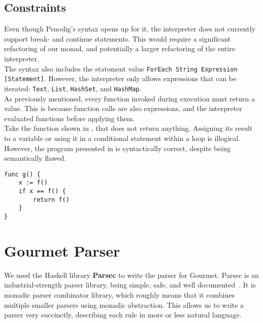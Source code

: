 \subsection{Constraints}

Even though Psnodig's syntax opens up for it, the interpreter does not currently support break- and continue statements. This would require a significant refactoring of our monad, and potentially a larger refactoring of the entire interpreter. \\

The syntax also includes the statement value \texttt{ForEach String Expression [Statement]}. However, the interpreter only allows expressions that can be iterated: \texttt{Text}, \texttt{List}, \texttt{HashSet}, and \texttt{HashMap}. \\

As previously mentioned, every function invoked during execution must return a value. This is because function calls are also expressions, and the interpreter evaluated functions before applying them. \\

Take the function shown in , that does not return anything. Assigning its result to a variable or using it in a conditional statement within a loop is illogical. However, the program presented in  is syntactically correct, despite being semantically flawed. \\

\begin{lstlisting}[caption={A syntactically correct Gourmet program, including three function call expressions.}, captionpos=b, label={crazyProg}]
func g() {
    x := f()
    if x == f() {
        return f()
    }
}
\end{lstlisting}

\section{Gourmet Parser}

We used the Haskell library \textbf{Parsec} to write the parser for Gourmet. Parsec is an industrial-strength parser library, being simple, safe, and well documented~\cite{parsec}. It is monadic parser combinator library, which roughly means that it combines multiple smaller parsers using monadic abstraction. This allows us to write a parser very succinctly, describing each rule in more or less natural language. \\

